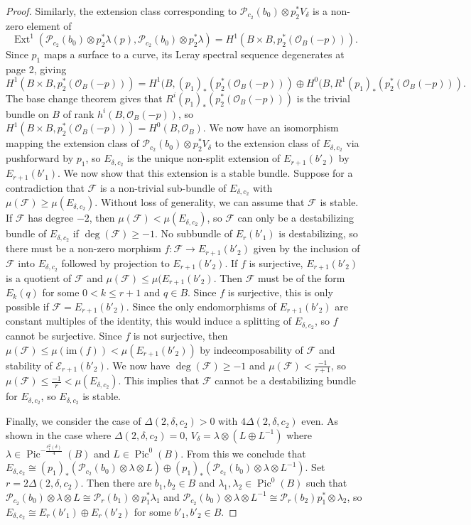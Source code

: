 \documentclass{article}[12pt]
\theoremstyle{definition}
\theoremstyle{remark}
\numberwithin{equation}{section}
\newcommand \mc{\mathcal}
\DeclareMathOperator{\Pic}{Pic}
\DeclareMathOperator{\Ext}{Ext}
\begin{document}
\begin{proof}
    Similarly, the extension class corresponding to $\mc{P}_{c_2}(b_0)\otimes p_2^*V_\delta$ is a non-zero element of $$\Ext^1(\mc{P}_{c_2}(b_0)\otimes p_2^*\lambda(p), \mc{P}_{c_2}(b_0)\otimes p_2^*\lambda)=H^1(B\times B, p_2^*(\mc{O}_B(-p))).$$
    Since $p_1$ maps a surface to a curve, its Leray spectral sequence degenerates at page 2, giving $$H^1(B\times B, p_2^*(\mc{O}_B(-p)))=H^1(B, (p_1)_*(p_2^*(\mc{O}_B(-p)))\oplus H^0(B,R^1(p_1)_*(p_2^*(\mc{O}_B(-p))).$$
    The base change theorem gives that $R^i(p_1)_*(p_2^*(\mc{O}_B(-p)))$ is the trivial bundle on $B$ of rank $h^i(B, \mc{O}_B(-p))$, so $H^1(B\times B, p_2^*(\mc{O}_B(-p)))=H^0(B, \mc{O}_B).$ We now have an isomorphism mapping the extension class of $\mc{P}_{c_2}(b_0)\otimes p_2^*V_\delta$ to the extension class of $E_{\delta,c_2}$ via pushforward by $p_1$, so $E_{\delta,c_2}$ is the unique non-split extension of $E_{r+1}(b'_2)$ by $E_{r+1}(b'_1)$. We now show that this extension is a stable bundle. Suppose for a contradiction that $\mc{F}$ is a non-trivial sub-bundle of $E_{\delta,c_2}$ with $\mu(\mc{F})\geq \mu(E_{\delta,c_2})$. Without loss of generality, we can assume that $\mc{F}$ is stable. If $\mc{F}$ has degree $-2$, then $\mu(\mc{F})<\mu(E_{\delta,c_2})$, so $\mc{F}$ can only be a destabilizing bundle of $E_{\delta,c_2}$ if $\deg(\mc{F})\geq -1$. No subbundle of $E_r(b'_1)$ is destabilizing, so there must be a non-zero morphism $f:\mc{F} \to E_{r+1}(b'_2)$ given by the inclusion of $\mc{F}$ into $E_{\delta,c_2}$ followed by projection to $E_{r+1}(b'_2)$. If $f$ is surjective, $E_{r+1}(b'_2)$ is a quotient of $\mc{F}$ and $\mu(\mc{F})\leq \mu(E_{r+1}(b'_2)$. Then $\mc{F}$ must be of the form $E_k(q)$ for some $0<k\leq r+1$ and $q \in B$. Since $f$ is surjective, this is only possible if $\mc{F}=E_{r+1}(b'_2)$. Since the only endomorphisms of $E_{r+1}(b'_2)$ are constant multiples of the identity, this would induce a splitting of $E_{\delta,c_2}$, so $f$ cannot be surjective. Since $f$ is not surjective, then $\mu(\mc{F})\leq \mu(\mathrm{im}(f))<\mu(E_{r+1}(b'_2))$ by indecomposability of $\mc{F}$ and stability of $\mc{E}_{r+1}(b'_2)$. We now have $\deg(\mc{F})\geq -1$ and $\mu(\mc{F})< \frac{-1}{r+1}$, so $\mu(\mc{F})\leq \frac{-1}{r}<\mu(E_{\delta,c_2})$. This implies that $\mc{F}$ cannot be a destabilizing bundle for $E_{\delta,c_2}$, so $E_{\delta,c_2}$ is stable.
    
    Finally, we consider the case of $\Delta(2,\delta,c_2)>0$ with $4\Delta(2,\delta,c_2)$ even. As shown in the case where $\Delta(2,\delta,c_2)=0$, $V_\delta=\lambda\otimes (L\oplus L^{-1})$ where $\lambda \in \Pic^{-\frac{c_1^2(\delta)}{4}}(B)$ and $L \in \Pic^0(B)$. From this we conclude that $E_{\delta,c_2}\cong (p_1)_*(\mc{P}_{c_2}(b_0)\otimes \lambda\otimes L)\oplus (p_1)_*(\mc{P}_{c_2}(b_0)\otimes \lambda\otimes L^{-1}).$ Set $r=2\Delta(2,\delta,c_2)$. Then there are $b_1,b_2\in B$ and $\lambda_1,\lambda_2 \in \Pic^0(B)$ such that $\mc{P}_{c_2}(b_0)\otimes \lambda\otimes L\cong\mc{P}_r(b_1)\otimes p_1^*\lambda_1$ and $\mc{P}_{c_2}(b_0)\otimes \lambda\otimes L^{-1}\cong \mc{P}_r(b_2)p_1^*\otimes \lambda_2$, so $E_{\delta,c_2}\cong E_r(b'_1)\oplus E_r(b'_2)$ for some $b'_1,b'_2 \in B$.
\end{proof}
\end{document}
